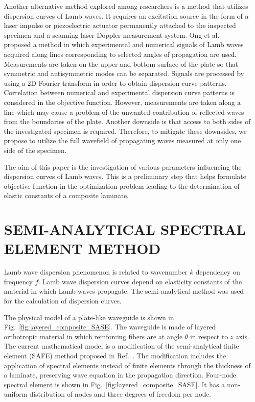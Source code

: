 \documentclass[]{spie}  %
\begin{document}
Another alternative method explored among researchers is a method that utilizes dispersion curves of Lamb waves.
It requires an excitation source in the form of a laser impulse or piezoelectric actuator permanently attached to the inspected specimen and a scanning laser Doppler measurement system.
Ong et al.~\cite{Ong2016} proposed a method in which experimental and numerical signals of Lamb waves acquired along lines corresponding to selected angles of propagation are used. 
Measurements are taken on the upper and bottom surface of the plate so that symmetric and antisymmetric modes can be separated.
Signals are processed by using a 2D Fourier transform in order to obtain dispersion curve patterns. 
Correlation between numerical and experimental dispersion curve patterns is considered in the objective function.
However, measurements are taken along a line which may cause a problem of the unwanted contribution of reflected waves from the boundaries of the plate.
Another downside is that access to both sides of the investigated specimen is required.
Therefore, to mitigate these downsides, we propose to utilize the full wavefield of propagating waves measured at only one side of the specimen.

The aim of this paper is the investigation of various parameters influencing the dispersion curves of Lamb waves.
This is a preliminary step that helps formulate objective function in the optimization problem leading to the determination of elastic constants of a composite laminate.

\section{SEMI-ANALYTICAL SPECTRAL ELEMENT METHOD}
\label{sec:sase}
Lamb wave dispersion phenomenon is related to wavenumber  \(k\) dependency on frequency \(f\). 
Lamb wave dispersion curves depend on elasticity constants of the material in which Lamb waves propagate.
The semi-analytical method was used for the calculation of dispersion curves.

The physical model of a plate-like waveguide is shown in Fig.~\ref{fig:layered_composite_SASE}.  
The waveguide is made of layered orthotropic material in which reinforcing fibers are at angle \(\theta\) in respect to \(z\) axis. 
The current mathematical model is a modification of the semi-analytical finite element (SAFE) method proposed in Ref.~. 
The modification includes the application of spectral elements instead of finite elements through the thickness of a laminate, preserving wave equation in the propagation direction. 
Four-node spectral element is shown in Fig.~\ref{fig:layered_composite_SASE}. 
It has a non-uniform distribution of nodes and three degrees of freedom per node.
\end{document}
